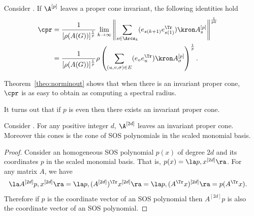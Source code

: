 \begin{theorem}
  \label{theo:norminout}
  Consider .
  If $\A^{[p]}$ leaves a proper cone invariant,
  the following identities hold
  \begin{align*}
    \cpr
    & = \frac{1}{[\rho(A(G))]^{\frac{1}{p}}}\lim_{k\to\infty} \left\|\sum_{s \in \Arcs_k}(e_{s(k+1)}e_{s(1)}^\Tr) \kron A_s^{[p]}\right\|^{\frac{1}{pk}}\\
    & = \frac{1}{[\rho(A(G))]^{\frac{1}{p}}}\rho\left(\sum_{(u,v,\sigma) \in E}(e_ve_u^\Tr) \kron A_\sigma^{[p]}\right)^{\frac{1}{p}}.
  \end{align*}
\end{theorem}


Theorem~\ref{theo:norminout} shows that when there is an invariant proper cone,
$\cpr$ is as easy to obtain as computing a spectral radius.

It turns out that if $p$ is even then there exists an invariant proper cone.
\begin{lemma}
  Consider .
  For any positive integer $d$,
  $\A^{[2d]}$ leaves an invariant proper cone.
  Moreover this cones is the cone of SOS polynomials in the
  scaled monomial basis.
  \begin{proof}
    Consider an homogeneous SOS polynomial $p(x)$ of degree $2d$ and
    its coordinates $p$ in the scaled monomial basis. That is,
    $p(x) = \la p,x^{[2d]}\ra$. For any matrix $A$, we have
    \[ \la A^{[2d]}p, x^{[2d]} \ra = \la p, (A^{[2d]})^\Tr x^{[2d]} \ra =
    \la p, (A^\Tr x)^{[2d]} \ra = p(A^\Tr x). \]
    Therefore if $p$ is the coordinate vector of an SOS polynomial
    then $A^{[2d]}p$ is also the coordinate vector of an SOS
    polynomial.
  \end{proof}
\end{lemma}
